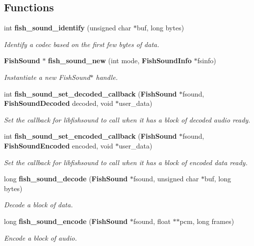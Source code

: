 \subsection*{Functions}
\begin{CompactItemize}
\item 
int {\bf fish\_\-sound\_\-identify} (unsigned char $\ast$buf, long bytes)
\begin{CompactList}\small\item\em Identify a codec based on the first few bytes of data. \item\end{CompactList}\item 
{\bf Fish\-Sound} $\ast$ {\bf fish\_\-sound\_\-new} (int mode, {\bf Fish\-Sound\-Info} $\ast$fsinfo)
\begin{CompactList}\small\item\em Instantiate a new Fish\-Sound$\ast$ handle. \item\end{CompactList}\item 
int {\bf fish\_\-sound\_\-set\_\-decoded\_\-callback} ({\bf Fish\-Sound} $\ast$fsound, {\bf Fish\-Sound\-Decoded} decoded, void $\ast$user\_\-data)
\begin{CompactList}\small\item\em Set the callback for libfishsound to call when it has a block of decoded audio ready. \item\end{CompactList}\item 
int {\bf fish\_\-sound\_\-set\_\-encoded\_\-callback} ({\bf Fish\-Sound} $\ast$fsound, {\bf Fish\-Sound\-Encoded} encoded, void $\ast$user\_\-data)
\begin{CompactList}\small\item\em Set the callback for libfishsound to call when it has a block of encoded data ready. \item\end{CompactList}\item 
long {\bf fish\_\-sound\_\-decode} ({\bf Fish\-Sound} $\ast$fsound, unsigned char $\ast$buf, long bytes)
\begin{CompactList}\small\item\em Decode a block of data. \item\end{CompactList}\item 
long {\bf fish\_\-sound\_\-encode} ({\bf Fish\-Sound} $\ast$fsound, float $\ast$$\ast$pcm, long frames)
\begin{CompactList}\small\item\em Encode a block of audio. \item\end{CompactList}\item 
$$
\end{CompactItemize}
